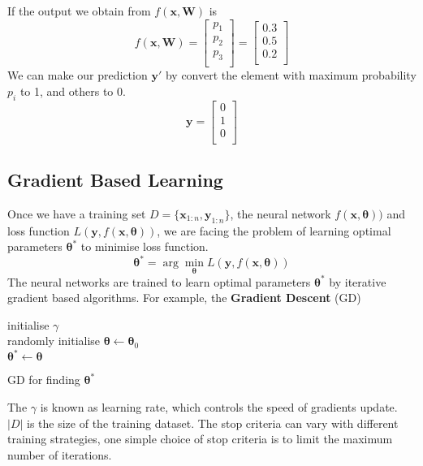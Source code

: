 If the output we obtain from $f(\mathbf{x},\mathbf{W})$ is 
\begin{equation}
f(\mathbf{x},\mathbf{W}) = \begin{bmatrix}
p_{1} \\
p_{2} \\
p_{3} \\
\end{bmatrix} = \begin{bmatrix}
0.3 \\
0.5 \\
0.2\\
\end{bmatrix}
\end{equation}
We can make our prediction $\mathbf{y}'$ by convert the element with maximum probability $p_{i}$ to 1, and others to 0.
\begin{equation}
\mathbf{y} = \begin{bmatrix}
0\\
1\\
0 \\
\end{bmatrix}
\end{equation}
\subsection{Gradient Based Learning}
Once we have a training set $D = \{\mathbf{x}_{1:n},\mathbf{y}_{1:n}\}$, the neural network $f(\mathbf{x},\mathbf{\theta}))$ and loss function $L(\mathbf{y},f(\mathbf{x},\mathbf{\theta}))$, we are facing the problem of learning optimal parameters $\mathbf{\theta}^{*}$ to minimise loss function.
\begin{equation}
\mathbf{\theta}^{*} = \arg\min_{\mathbf{\theta}}L(\mathbf{y},f(\mathbf{x},\mathbf{\theta}))
\end{equation}
The neural networks are trained to learn optimal parameters $\mathbf{\theta}^{*}$ by iterative gradient based algorithms. 
For example, the \textbf{Gradient Descent} (GD)
\begin{algorithm}[H]
	initialise $\gamma$ \\
	randomly initialise $\mathbf{\theta} \gets \mathbf{\theta}_{0}$ \\
	$\mathbf{\theta}^{*} \gets \mathbf{\theta}$
	\caption{GD for finding $\mathbf{\theta}^{*}$}
\end{algorithm}
\noindent
The $\gamma$ is known as learning rate, which controls the speed of gradients update. $|D|$ is the size of the training dataset. 
The stop criteria can vary with different training strategies, one simple choice of stop criteria is to limit the maximum number of iterations.

